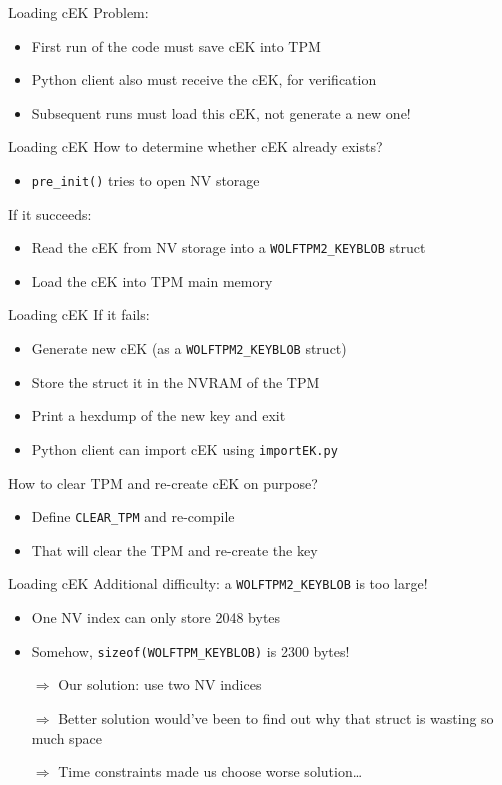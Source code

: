 \begin{frame}{Loading cEK}
Problem:
\begin{itemize}
\item First run of the code must save cEK into TPM
\item Python client also must receive the cEK, for verification
\item Subsequent runs must load this cEK, not generate a new one!
\end{itemize}
\end{frame}

\begin{frame}{Loading cEK}
How to determine whether cEK already exists?
\begin{itemize}
\item \texttt{pre\_init()} tries to open NV storage
\end{itemize}

If it succeeds:
\begin{itemize}
\item Read the cEK from NV storage into a \texttt{WOLFTPM2\_KEYBLOB} struct
\item Load the cEK into TPM main memory
\end{itemize}
\end{frame}

\begin{frame}{Loading cEK}
If it fails:

\begin{itemize}
\item Generate new cEK (as a \texttt{WOLFTPM2\_KEYBLOB} struct)
\item Store the struct it in the NVRAM of the TPM
\item Print a hexdump of the new key and exit
\item Python client can import cEK using \texttt{importEK.py}
\end{itemize}

How to clear TPM and re-create cEK on purpose?

\begin{itemize}
\item Define \texttt{CLEAR\_TPM} and re-compile
\item That will clear the TPM and re-create the key
\end{itemize}
\end{frame}

\begin{frame}{Loading cEK}
Additional difficulty: a \texttt{WOLFTPM2\_KEYBLOB} is too large!

\begin{itemize}
\item One NV index can only store 2048 bytes
\item Somehow, \texttt{sizeof(WOLFTPM\_KEYBLOB)} is \ttilde{}2300 bytes!
\item[$\Rightarrow$] Our solution: use two NV indices
\item[$\Rightarrow$] Better solution would've been to find out why that struct is wasting so much space
\item[$\Rightarrow$] Time constraints made us choose worse solution\ldots
\end{itemize}
\end{frame}
